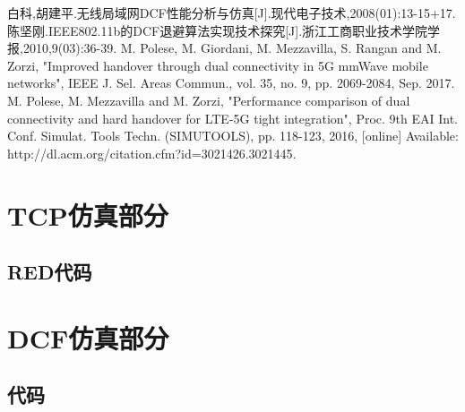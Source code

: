 \documentclass{article}
\begin{document}
\begin{thebibliography}{99}
	 白科,胡建平.无线局域网DCF性能分析与仿真[J].现代电子技术,2008(01):13-15+17.
	 陈坚刚.IEEE802.11b的DCF退避算法实现技术探究[J].浙江工商职业技术学院学报,2010,9(03):36-39.
	 M. Polese, M. Giordani, M. Mezzavilla, S. Rangan and M. Zorzi, "Improved handover through dual connectivity in 5G mmWave mobile networks", IEEE J. Sel. Areas Commun., vol. 35, no. 9, pp. 2069-2084, Sep. 2017.
	 M. Polese, M. Mezzavilla and M. Zorzi, "Performance comparison of dual connectivity and hard handover for LTE-5G tight integration", Proc. 9th EAI Int. Conf. Simulat. Tools Techn. (SIMUTOOLS), pp. 118-123, 2016, [online] Available: http://dl.acm.org/citation.cfm?id=3021426.3021445.
\end{thebibliography}

\appendix
\section{TCP仿真部分}

\subsection {\bf RED代码}


\section{DCF仿真部分}
\subsection{代码}

\end{document}
